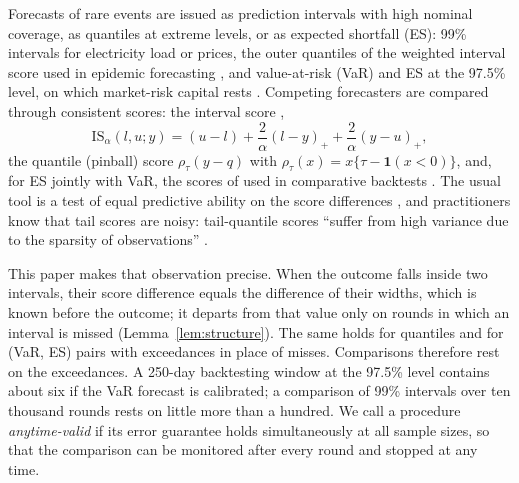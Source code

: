 \documentclass[11pt]{article}
\theoremstyle{remark}
\theoremstyle{definition}
\newcommand{\IS}{\mathrm{IS}}
\newcommand{\ind}{\mathbf{1}}
\begin{document}
Forecasts of rare events are issued as prediction intervals with high
nominal coverage, as quantiles at extreme levels, or as expected shortfall
(ES): 99\% intervals for electricity load or prices, the outer quantiles of
the weighted interval score used in epidemic forecasting
\citep{bracher2021evaluating}, and value-at-risk (VaR) and ES at the 97.5\%
level, on which market-risk capital rests \citep{bcbs2019minimum}.
Competing forecasters are compared through consistent scores: the interval
score \citep{winkler1972decision,gneiting2007strictly},
\begin{equation}
 \IS_\alpha(l,u;y)=(u-l)+\frac2\alpha(l-y)_++\frac2\alpha(y-u)_+,
 \label{eq:is}
\end{equation}
the quantile (pinball) score $\rho_\tau(y-q)$ with
$\rho_\tau(x)=x\{\tau-\ind(x<0)\}$, and, for ES jointly with VaR, the scores
of \citet{fissler2016higher} used in comparative backtests
\citep{nolde2017elicitability}. The usual tool is a test of equal
predictive ability on the score differences
\citep{diebold1995comparing,giacomini2006tests}, and practitioners know
that tail scores are noisy: tail-quantile scores ``suffer from high variance
due to the sparsity of observations'' \citep{browell2021probabilistic}.

This paper makes that observation precise. When the outcome falls inside
two intervals, their score difference equals the difference of their widths,
which is known before the outcome; it departs from that value only on
rounds in which an interval is missed (Lemma~\ref{lem:structure}). The same
holds for quantiles and for (VaR, ES) pairs with exceedances in place of
misses. Comparisons therefore rest on the exceedances. A 250-day
backtesting window at the 97.5\% level contains about six if the VaR
forecast is calibrated; a comparison of 99\% intervals over ten thousand
rounds rests on little more than a hundred. We call a procedure
\emph{anytime-valid} if its error guarantee holds simultaneously at all
sample sizes, so that the comparison can be monitored after every round and
stopped at any time.
\end{document}

